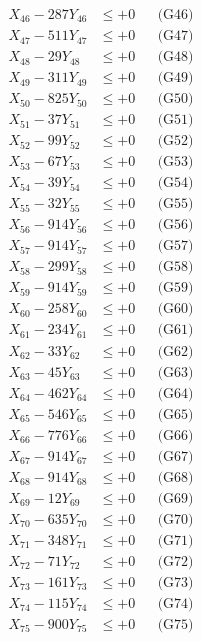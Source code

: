 \documentclass[a4paper,10pt]{article}
\begin{document}
{\begin{align}
X_{46} - 287Y_{46} &\leq +0 && \text{(G46)} \\
X_{47} - 511Y_{47} &\leq +0 && \text{(G47)} \\
X_{48} - 29Y_{48} &\leq +0 && \text{(G48)} \\
X_{49} - 311Y_{49} &\leq +0 && \text{(G49)} \\
X_{50} - 825Y_{50} &\leq +0 && \text{(G50)} \\
\allowbreak
X_{51} - 37Y_{51} &\leq +0 && \text{(G51)} \\
X_{52} - 99Y_{52} &\leq +0 && \text{(G52)} \\
X_{53} - 67Y_{53} &\leq +0 && \text{(G53)} \\
X_{54} - 39Y_{54} &\leq +0 && \text{(G54)} \\
X_{55} - 32Y_{55} &\leq +0 && \text{(G55)} \\
X_{56} - 914Y_{56} &\leq +0 && \text{(G56)} \\
X_{57} - 914Y_{57} &\leq +0 && \text{(G57)} \\
X_{58} - 299Y_{58} &\leq +0 && \text{(G58)} \\
X_{59} - 914Y_{59} &\leq +0 && \text{(G59)} \\
X_{60} - 258Y_{60} &\leq +0 && \text{(G60)} \\
\allowbreak
X_{61} - 234Y_{61} &\leq +0 && \text{(G61)} \\
X_{62} - 33Y_{62} &\leq +0 && \text{(G62)} \\
X_{63} - 45Y_{63} &\leq +0 && \text{(G63)} \\
X_{64} - 462Y_{64} &\leq +0 && \text{(G64)} \\
X_{65} - 546Y_{65} &\leq +0 && \text{(G65)} \\
X_{66} - 776Y_{66} &\leq +0 && \text{(G66)} \\
X_{67} - 914Y_{67} &\leq +0 && \text{(G67)} \\
X_{68} - 914Y_{68} &\leq +0 && \text{(G68)} \\
X_{69} - 12Y_{69} &\leq +0 && \text{(G69)} \\
X_{70} - 635Y_{70} &\leq +0 && \text{(G70)} \\
\allowbreak
X_{71} - 348Y_{71} &\leq +0 && \text{(G71)} \\
X_{72} - 71Y_{72} &\leq +0 && \text{(G72)} \\
X_{73} - 161Y_{73} &\leq +0 && \text{(G73)} \\
X_{74} - 115Y_{74} &\leq +0 && \text{(G74)} \\
X_{75} - 900Y_{75} &\leq +0 && \text{(G75)} \\

\end{align}}
\end{document}
